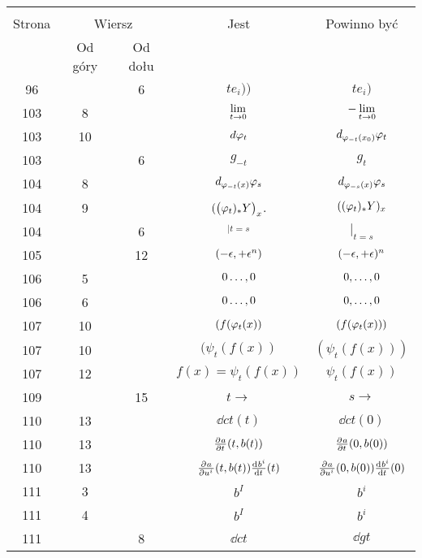 \documentclass[a4paper,11pt]{article}
\begin{document}
\begin{center}
  \begin{tabular}{|c|c|c|c|c|}
    \hline
    & \multicolumn{2}{c|}{} & & \\
    Strona & \multicolumn{2}{c|}{Wiersz} & Jest
                              & Powinno być \\ \cline{2-3}
    & Od góry & Od dołu & & \\
    \hline
    96  & &  6 & $t e_{ i } ))$ & $t e_{ i } )$ \\
    103 &  8 & & $\lim\limits_{ \substack{ t \to 0 } }$
           & $-\lim\limits_{ \substack{ t \to 0 } }$ \\
    103 & 10 & & $d \varphi_{ t }$ & $d_{ \varphi_{ -t }( x_{ 0 } ) } \varphi_{ t }$ \\
    103 & & 6 & $g_{ -t }$ & $g_{ t }$ \\
    104 &  8 & & $d_{ \varphi_{ -t }( x ) } \varphi_{ s }$
           & $d_{ \varphi_{ -s }( x ) } \varphi_{ s }$ \\
    104 &  9 & & $( \big( \varphi_{ t } )_{*} Y \big)_{ x }$.
           & $( ( \varphi_{ t } )_{ * } Y )_{ x }$ \\
    104 & &  6 & $_{ | t = s }$ & $|_{ t = s }$ \\
    105 & & 12 & $( - \epsilon, + \epsilon^{ n } )$ & $( -\epsilon, +\epsilon )^{ n }$ \\
    106 &  5 & & $0\ldots, 0$ & $0, \ldots, 0$ \\
    106 &  6 & & $0\ldots, 0$ & $0, \ldots, 0$ \\
    107 & 10 & & $( f( \varphi_{ t }( x ) )$ & $( f( \varphi_{ t }( x ) ) )$ \\
    107 & 10 & & $( \psi_{ t } ( f( x ) )$ & $( \psi_{ t } ( f( x ) ) )$ \\
    107 & 12 & & $f( x ) = \psi_{ t } ( f( x ) )$
           & $\psi_{ t } ( f( x ) )$ \\
    109 & & 15 & $t \to$ & $s \to$ \\
    110 & 13 & & $\dd{}{ c }{ t }( t )$ & $\dd{}{ c }{ t }( 0 )$ \\
    110 & 13 & & $\frac{ \partial^{  } {  a  } }{ \partial {  t  }^{  } }( t, b( t ) )$
           & $\frac{ \partial^{  } {  a  } }{ \partial {  t  }^{  } }( 0, b( 0 ) )$ \\
    110 & 13 & & $\frac{ \partial^{  } {  a  } }{ \partial {  { u^{ i } }  }^{  } }( t, b( t ) )
                 \frac{ \mathrm{d}^{  } {  { b^{ i } }  } }{ \mathrm{d} {  t  }^{  } }( t )$
           & $\frac{ \partial^{  } {  a  } }{ \partial {  { u^{ i } }  }^{  } }( 0, b( 0 ) )
             \frac{ \mathrm{d}^{  } {  { b^{ i } }  } }{ \mathrm{d} {  t  }^{  } }( 0 )$ \\
    111 &  3 & & $b^{ I }$ & $b^{ i }$ \\
    111 &  4 & & $b^{ I }$ & $b^{ i }$ \\
    111 & &  8 & $\dd{}{ c }{ t }$ & $\dd{}{ g }{ t }$ \\

\end{tabular}
\end{center}
\end{document}
